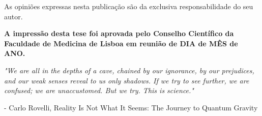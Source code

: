 \documentclass[12pt,a4paper,twoside,openright]{book}
\def\blankpage{%
      \clearpage%
      \thispagestyle{empty}%
      \null%
      \clearpage}
\begin{document}
\begin{sloppy}
\frontmatter


\clearpage \thispagestyle{empty}\mbox{}\clearpage


\clearpage \thispagestyle{empty}\mbox{}\clearpage

\newpage
\thispagestyle{empty}
\vspace*{\fill}
\begin{center}
    \vspace*{\fill}
    As opiniões expressas nesta publicação são da exclusiva responsabilidade do seu autor. \\
    
    \vspace*{2cm}
    
    \begingroup
        \fontsize{14pt}{12pt}\selectfont
        \textbf{A impressão desta tese foi aprovada pelo Conselho Científico da Faculdade de Medicina de Lisboa em reunião de DIA de MÊS de ANO.}
    \endgroup
\end{center}
\blankpage

\newpage
\thispagestyle{empty}
\vspace*{3cm}
\begin{center}
\emph{"We are all in the depths of a cave, chained by our ignorance, by our prejudices, and our weak senses reveal to us only shadows. If we try to see further, we are confused; we are unaccustomed. But we try. This is science."} \\
\end{center} 
\begin{flushright}- Carlo Rovelli, Reality Is Not What It Seems: The Journey to Quantum Gravity\end{flushright}
\clearpage \thispagestyle{empty}\mbox{}\clearpage

\newpage
\thispagestyle{plain}

\end{sloppy}
\end{document}
